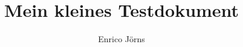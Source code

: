 \documentclass[style=screen,extramargin]{tubsartcl}
\begin{document}
\author{Enrico Jörns}
\title{Mein kleines Testdokument}

\maketitle[image]
% 
% 
% 
\lipsum[1-5]
\end{document}
